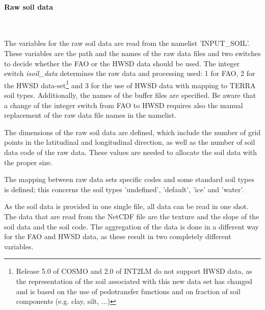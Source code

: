 \documentclass[a4paper,10pt,DIV14,BCOR1cm,titlepage,twoside]{scrartcl}
\begin{document}
\paragraph{Raw soil data}\ \par\medskip\noindent
The variables for the raw soil data are read from the namelist 'INPUT\_SOIL'. These variables are the path and the names of the raw data files and two switches to decide whether the FAO or the HWSD data should be used. The integer switch \textit{isoil\_data} determines the raw data and processing used: 1 for FAO, 2 for the HWSD data-set\footnote{Release 5.0 of COSMO and 2.0 of INT2LM do not support HWSD data, as the representation of the soil associated with this new data set has changed and is based on the use of pedotransfer functions and on fraction of soil components (e.g. clay, silt, ...)} and 3 for the use of HWSD data with mapping to TERRA soil types. Additionally, the names of the buffer files are specified. Be aware that a change of the integer switch from FAO to HWSD requires also the manual replacement of the raw data file  names in the namelist. \par\medskip\noindent
The dimensions of the raw soil data are defined, which include the number of grid points in the latitudinal and longitudinal direction, as well as the number of soil data code of the raw data. These values are needed to allocate the soil data with the proper size. \par\medskip\noindent
The mapping between raw data sets specific codes and some standard soil types is defined; this concerns the soil types 'undefined', 'default', 'ice' and 'water'. \par\medskip\noindent
As the soil data is provided in one single file, all data can be read in one shot. The data that are read from the NetCDF file are the texture and the slope of the soil data and the soil code. The aggregation of the data is done in a different way for the FAO and HWSD data, as these result in two completely different variables. \par\medskip\noindent
\end{document}
